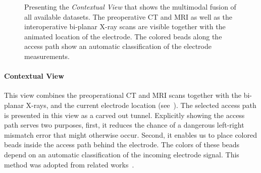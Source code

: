 \begin{figure}
\begin{subfigure}[b]{0.49\linewidth}
\end{subfigure}
\caption{Presenting the \emph{Contextual View} that shows the multimodal fusion of all available datasets. The preoperative CT and MRI as well as the interoperative bi-planar X-ray scans are visible together with the animated location of the electrode. The colored beads along the access path show an automatic classification of the electrode measurements.}
\label{contributions:medbio:dbs:contextual}
\end{figure}

\paragraph{Contextual View} This  view combines the preoperational CT and MRI scans together with the bi-planar X-rays, and the current electrode location (see~). The selected access path is presented in this view as a carved out tunnel. Explicitly showing the access path serves two purposes, first, it reduces the chance of a dangerous left-right mismatch error that might otherwise occur. Second, it enables us to place colored beads inside the access path behind the electrode. The colors of these beads depend on an automatic classification of the incoming electrode signal. This method was adopted from related works~\cite{Haese2005, Miocinovic2007}.

